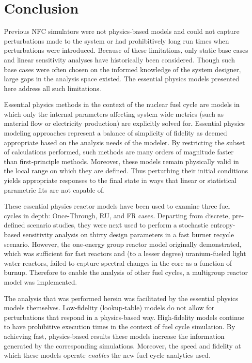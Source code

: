 \chapter{Conclusion}
\label{diss_conclusion}
Previous NFC simulators were not physics-based models and could not capture perturbations made to the system
or had prohibitively long run times when perturbations were introduced.  Because of these 
limitations, only static base cases and linear sensitivity analyses have historically been considered.  
Though such base cases were often chosen on the informed knowledge of the system designer, 
large gaps in the analysis space existed.  The essential physics models presented here address all such 
limitations.

Essential physics methods in the context of the nuclear fuel cycle are models 
in which only the internal parameters affecting system wide metrics (such as material flow
or electricity production) are explicitly solved for.  
Essential physics modeling approaches represent a balance of simplicity of fidelity as deemed 
appropriate based on the analysis needs of the modeler.
By restricting the subset of 
calculations performed, such methods are many orders of magnitude faster than first-principle 
methods.  Moreover, these models remain physically valid in the local range on which they are defined.
Thus perturbing their initial conditions yields appropriate responses to the final state
in ways that linear or statistical parametric fits are not capable of.

These essential physics reactor models have been used to examine three fuel cycles 
in depth: Once-Through, RU, and FR cases.  
Departing from discrete, pre-defined scenario studies, they were next used to perform 
a stochastic entropy-based sensitivity analysis on thirty design parameters in a fast
burner recycle scenario.  However, the one-energy group reactor model originally demonstrated, 
which was sufficient for fast reactors and (to a lesser degree) uranium-fueled light 
water reactors,  failed to capture 
spectral changes in the core as a function of burnup.
Therefore to enable the analysis of other fuel cycles, a multigroup reactor model was implemented.  

The analysis that was performed herein was facilitated by the essential physics models themselves.
Low-fidelity (lookup-table) models do not allow for perturbations that respond 
in a physics-based way.  High-fidelity models continue to have prohibitive execution times in the 
context of fuel cycle simulation.  By achieving fast, physics-based results these models increase 
the information generated by the corresponding simulations.
Moreover, the speed and fidelity at which these models operate \emph{enables} the 
new fuel cycle analytics used.  

